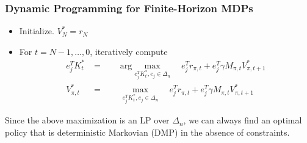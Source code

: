 \documentclass[]{article}
\begin{document}
\subsubsection*{Dynamic Programming for Finite-Horizon MDPs}
\begin{itemize}
\item Initialize. $V_N^* = r_N$
\item For $t=N-1,\dots,0$, iteratively compute
\begin{align}
e_j^T K_t^* & = \qquad \text{arg} \max_{e_j^T K_t^*, e_j \in \Delta_n} \quad e_j^Tr_{\pi,t} + e_j^T \gamma M_{\pi,t} V_{\pi,t+1}^* \\
V^*_{\pi,t} & = \qquad \max_{e_j^T K_t^*, e_j \in \Delta_n} \quad e_j^Tr_{\pi,t} + e_j^T \gamma M_{\pi,t} V_{\pi,t+1}^*  
\end{align}
\end{itemize}
Since the above maximization is an LP over $\Delta_n$, we can always find an optimal policy that is deterministic Markovian (DMP) in the absence of constraints.  
\end{document}

